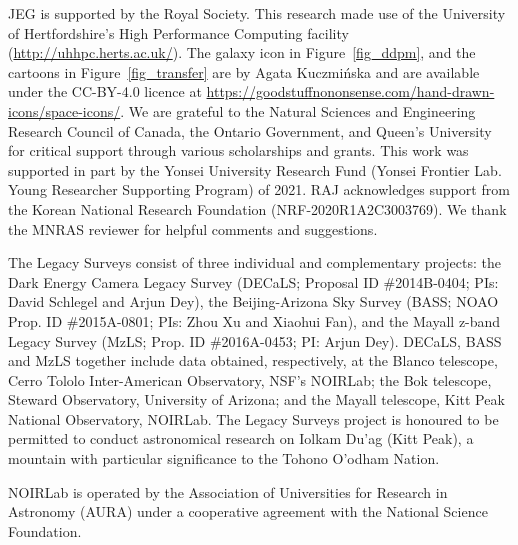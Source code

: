 \documentclass[fleqn,usenatbib]{mnras}
\begin{document}
JEG is supported by the Royal Society. This research made use of the University
of Hertfordshire's High Performance Computing facility
(\url{http://uhhpc.herts.ac.uk/}).  The galaxy icon in Figure~\ref{fig_ddpm},
and the cartoons in Figure~\ref{fig_transfer} are by Agata Kuczmi\'nska and are
available under the \mbox{CC-BY-4.0} licence at
\url{https://goodstuffnononsense.com/hand-drawn-icons/space-icons/}. We are
grateful to the Natural Sciences and Engineering Research Council of Canada,
the Ontario Government, and Queen’s University for critical support through
various scholarships and grants. This work was supported in part by the Yonsei
University Research Fund (Yonsei Frontier Lab. Young Researcher Supporting
Program) of 2021. RAJ acknowledges support from the Korean National Research
Foundation (NRF-2020R1A2C3003769). We thank the MNRAS reviewer for helpful
comments and suggestions.

The Legacy Surveys consist of three individual and complementary projects: the
Dark Energy Camera Legacy Survey (DECaLS; Proposal ID \#2014B-0404; PIs: David
Schlegel and Arjun Dey), the Beijing-Arizona Sky Survey (BASS; NOAO Prop. ID
\#2015A-0801; PIs: Zhou Xu and Xiaohui Fan), and the Mayall z-band Legacy Survey
(MzLS; Prop. ID \#2016A-0453; PI: Arjun Dey). DECaLS, BASS and MzLS together
include data obtained, respectively, at the Blanco telescope, Cerro Tololo
Inter-American Observatory, NSF’s NOIRLab; the Bok telescope, Steward
Observatory, University of Arizona; and the Mayall telescope, Kitt Peak
National Observatory, NOIRLab. The Legacy Surveys project is honoured to be
permitted to conduct astronomical research on Iolkam Du’ag (Kitt Peak), a
mountain with particular significance to the Tohono O’odham Nation.

NOIRLab is operated by the Association of Universities for Research in
Astronomy (AURA) under a cooperative agreement with the National Science
Foundation.
\end{document}
